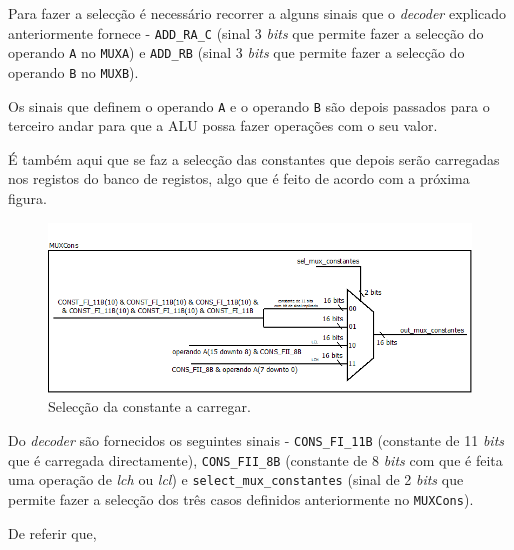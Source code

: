 \documentclass[11pt]{article}
\numberwithin{equation}{section}
\begin{document}
Para fazer a selecção é necessário recorrer a alguns sinais que o \textit{decoder} explicado anteriormente fornece - \texttt{ADD\_RA\_C} (sinal 3 \textit{bits} que permite fazer a selecção do operando \texttt{A} no \texttt{MUXA}) e \texttt{ADD\_RB} (sinal 3 \textit{bits} que permite fazer a selecção do operando \texttt{B} no \texttt{MUXB}). 


Os sinais que definem o operando \texttt{A} e o operando \texttt{B} são depois passados para o terceiro andar para que a ALU possa fazer operações com o seu valor.

É também aqui que se faz a selecção das constantes que depois serão carregadas nos registos do banco de registos, algo que é feito de acordo com a próxima figura.

\vspace{-2.1mm}

\begin{figure}[H]
	\centering
	\includegraphics[keepaspectratio=true, scale=0.40]{imagens/OF2}
	\caption{Selecção da constante a carregar.}
	\vspace{-0.8em}
\end{figure}

Do \textit{decoder} são fornecidos os seguintes sinais - \texttt{CONS\_FI\_11B} (constante de 11 \textit{bits} que é carregada directamente), \texttt{CONS\_FII\_8B} (constante de 8 \textit{bits} com que é feita uma operação de \textit{lch} ou \textit{lcl}) e \texttt{select\_mux\_constantes}  (sinal de 2 \textit{bits} que permite fazer a selecção dos três casos definidos anteriormente no \texttt{MUXCons}).

De referir que, 
\end{document}

